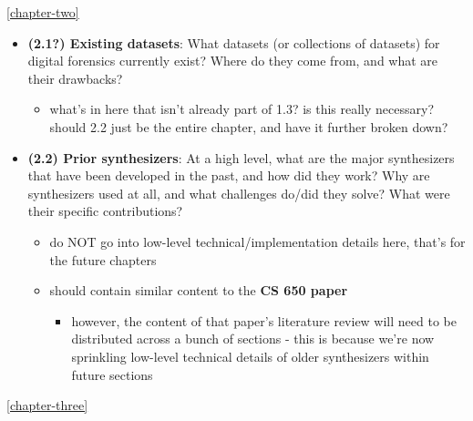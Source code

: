 \autoref{chapter-two}

\begin{itemize}
\tightlist
\item
  \textbf{(2.1?) Existing datasets}: What datasets (or collections of
  datasets) for digital forensics currently exist? Where do they come
  from, and what are their drawbacks?

  \begin{itemize}
  \tightlist
  \item
    what's in here that isn't already part of 1.3? is this really
    necessary? should 2.2 just be the entire chapter, and have it
    further broken down?
  \end{itemize}
\item
  \textbf{(2.2) Prior synthesizers}: At a high level, what are the major
  synthesizers that have been developed in the past, and how did they
  work? Why are synthesizers used at all, and what challenges do/did
  they solve? What were their specific contributions?

  \begin{itemize}
  \tightlist
  \item
    do NOT go into low-level technical/implementation details here,
    that's for the future chapters
  \item
    should contain similar content to the \textbf{CS 650 paper}

    \begin{itemize}
    \tightlist
    \item
      however, the content of that paper's literature review will need
      to be distributed across a bunch of sections - this is because
      we're now sprinkling low-level technical details of older
      synthesizers within future sections
    \end{itemize}
  \end{itemize}
\end{itemize}

\autoref{chapter-three}

